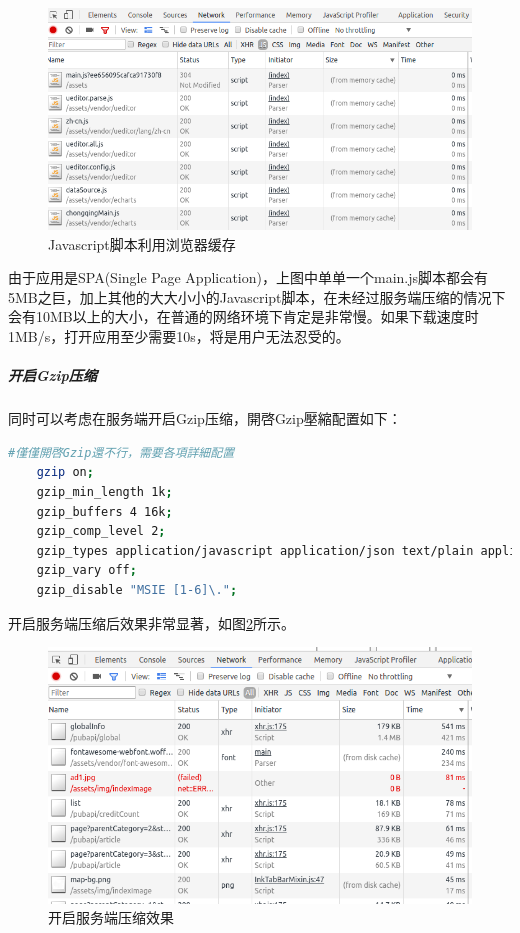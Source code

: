 \documentclass[11pt,fleqn]{book}
\numberwithin{dummy}{section}
\theoremstyle{ocrenumbox}
\theoremstyle{blacknumex}
\theoremstyle{blacknumbox}
\theoremstyle{ocrenum}
\begin{document}
	\begin{figure}[htbp]
		\centering
		\includegraphics[scale=0.45]{scriptusingdiskcache.png}
		\caption{Javascript脚本利用浏览器缓存}
		\label{fig:scriptusingdiskcache}
	\end{figure}
	
	由于应用是SPA(Single Page Application)，上图中单单一个main.js脚本都会有5MB之巨，加上其他的大大小小的Javascript脚本，在未经过服务端压缩的情况下会有10MB以上的大小，在普通的网络环境下肯定是非常慢。如果下载速度时1MB/s，打开应用至少需要10s，将是用户无法忍受的。
	
	\subparagraph{开启Gzip压缩}
	
	同时可以考虑在服务端开启Gzip压缩，開啓Gzip壓縮配置如下：
	
	\begin{lstlisting}[language=Bash]
	#僅僅開啓Gzip還不行，需要各項詳細配置
	gzip on;
	gzip_min_length 1k;
	gzip_buffers 4 16k;
	gzip_comp_level 2;
	gzip_types application/javascript application/json text/plain application/x-javascript text/css application/xml text/javascript application/x-httpd-php image/jpeg image/gif image/png;
	gzip_vary off;
	gzip_disable "MSIE [1-6]\.";
	\end{lstlisting}
	
	开启服务端压缩后效果非常显著，如图\ref{fig:openservercompress}所示。
	
	\begin{figure}[htbp]
		\centering
		\includegraphics[scale=0.5]{openservercompress.png}
		\caption{开启服务端压缩效果}
		\label{fig:openservercompress}
	\end{figure}
	
\end{document}
